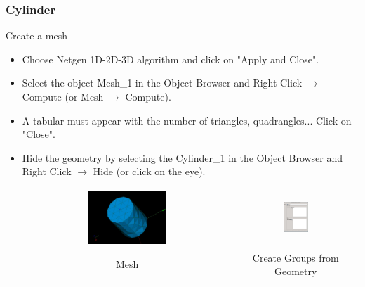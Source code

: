 \documentclass[10pt, hyperref={unicode=true,pdfusetitle, bookmarks=true,bookmarksnumbered=false,bookmarksopen=false, breaklinks=false,pdfborder={0 0 1},backref=true,colorlinks=true,linkcolor=darkblue,pageanchor}]{beamer}
\begin{document}
\begin{frame}
\frametitle{Cylinder}
\begin{block}{Create a mesh}

\begin{itemize}
\item Choose Netgen 1D-2D-3D algorithm and click on "Apply and Close".
\item Select the object Mesh\_1 in the Object Browser and Right Click $\rightarrow$ Compute (or Mesh $\rightarrow$ Compute).
\item A tabular must appear with the number of triangles, quadrangles... Click on "Close".
\item Hide the geometry by selecting the Cylinder\_1 in the Object Browser and Right Click $\rightarrow$ Hide (or click on the eye).
\begin{tabular}{cc}
\includegraphics[width=0.39\textwidth]{PICTURES/salome4} & \includegraphics[width=0.21\textwidth]{PICTURES/salome5}\tabularnewline
Mesh & Create Groups from Geometry \tabularnewline
\end{tabular}

\end{itemize}

\end{block}
\end{frame}
\end{document}
